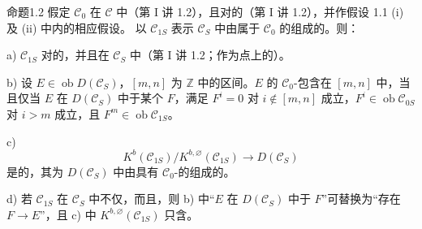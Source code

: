 \begin{SGAresult}{命题}{1.2}
假定 $\mathcal C_0$ 在 $\mathcal C$ 中（第 I 讲 1.2），且对的（第 I 讲 1.2），并作假设 1.1 (i) 及 (ii) 中内的相应假设。
以 $\mathcal C_{1S}$ 表示 $\mathcal C_S$ 中由属于 $\mathcal C_0$ 的组成的。则：

a) $\mathcal C_{1S}$ 对的，并且在 $\mathcal C_S$ 中（第 I 讲 1.2；作为点上的）。

b) 设 $E\in\operatorname{ob}D(\mathcal C_S)$，$[m,n]$ 为 $\mathbb Z$ 中的区间。$E$ 的 $\mathcal C_0$-包含在 $[m,n]$ 中，当且仅当 $E$ 在 $D(\mathcal C_S)$ 中于某个 $F$，满足 $F^i=0$ 对 $i\notin[m,n]$ 成立，$F^i\in\operatorname{ob}\mathcal C_{0S}$ 对 $i>m$ 成立，且 $F^m\in\operatorname{ob}\mathcal C_{1S}$。

c) 
\[
K^b(\mathcal C_{1S})/K^{b,\varnothing}(\mathcal C_{1S})\longrightarrow D(\mathcal C_S)
\]
是的，其为 $D(\mathcal C_S)$ 中由具有 $\mathcal C_0$-的组成的。

d) 若 $\mathcal C_{1S}$ 在 $\mathcal C_S$ 中不仅，而且，则 b) 中“$E$ 在 $D(\mathcal C_S)$ 中于 $F$”可替换为“存在 $F\to E$”，且 c) 中 $K^{b,\varnothing}(\mathcal C_{1S})$ 只含。
\end{SGAresult}
